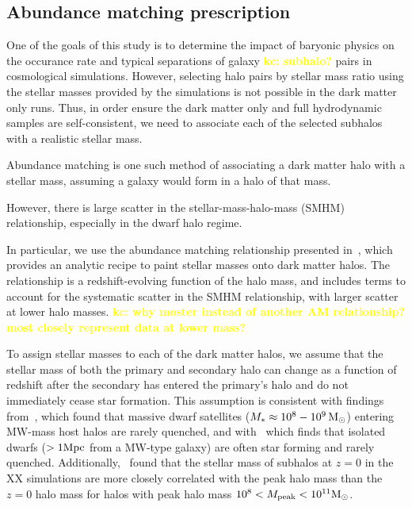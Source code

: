 \documentclass[twocolumn]{aastex631}
\newcommand{\kc}[1]{\textcolor{yellow}{\textbf{kc: #1}} }
\begin{document}
\subsection{Abundance matching prescription}\label{sec:methods-am}
One of the goals of this study is to determine the impact of baryonic physics on the occurance rate and typical separations of galaxy \kc{subhalo?} pairs in cosmological simulations. 
However, selecting halo pairs by stellar mass ratio using the stellar masses provided by the simulations is not possible in the dark matter only runs. 
Thus, in order ensure the dark matter only and full hydrodynamic samples are self-consistent, we need to associate each of the selected subhalos with a realistic stellar mass.

Abundance matching is one such method of associating a dark matter halo with a stellar mass, assuming a galaxy would form in a halo of that mass. 

However, there is large scatter in the stellar-mass-halo-mass (SMHM) relationship, especially in the dwarf halo regime. 



In particular, we use the abundance matching relationship presented in~\citet{moster13}, which provides an analytic recipe to paint stellar masses onto dark matter halos. 
The~\citet{moster13} relationship is a redshift-evolving function of the halo mass, and includes terms to account for the systematic scatter in the SMHM relationship, with larger scatter at lower halo masses.
\kc{why moster instead of another AM relationship? most closely represent data at lower mass? }

To assign stellar masses to each of the dark matter halos, we assume that the stellar mass of both the primary and secondary halo can change as a function of redshift after the secondary has entered the primary's halo and do not immediately cease star formation.
This assumption is consistent with findings from~\cite{Akins2021}, which found that massive dwarf satellites ($M_*\approx 10^8-10^9\, \mathrm{M}_\odot$) entering MW-mass host halos are rarely quenched, and with~\cite{geha13} which finds that isolated dwarfs ($>1\mathrm{Mpc}$ from a MW-type galaxy) are often star forming and rarely quenched.
Additionally,~\citet{Munshi2021} found that the stellar mass of subhalos at $z=0$ in the XX simulations are more closely correlated with the peak halo mass than the $z=0$ halo mass for halos with peak halo mass $10^8<M_{\rm peak}<10^{11} \mathrm{M}_\odot$. 
\end{document}
